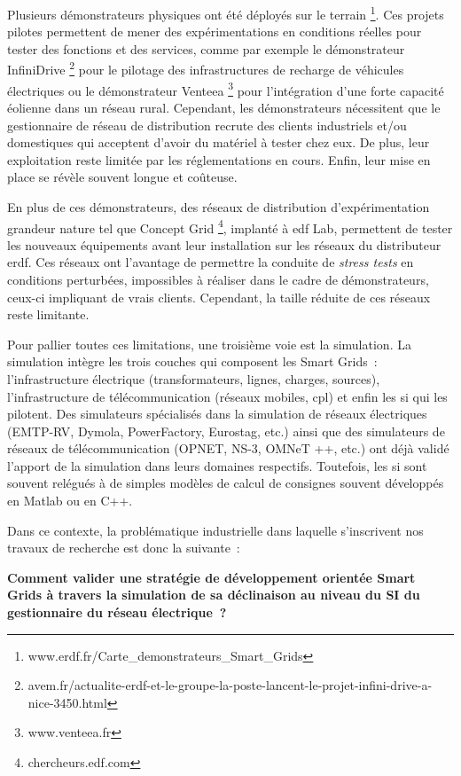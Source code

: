 Plusieurs démonstrateurs physiques ont été déployés sur le terrain 
\footnote{www.erdf.fr/Carte\_demonstrateurs\_Smart\_Grids}. Ces projets pilotes 
permettent de mener des expérimentations en conditions réelles pour tester des 
fonctions et des services, comme par exemple le démonstrateur InfiniDrive 
\footnote{avem.fr/actualite-erdf-et-le-groupe-la-poste-lancent-le-projet-infini-drive-a-nice-3450.html} 
pour le pilotage des infrastructures de recharge de véhicules électriques ou le 
démonstrateur Venteea \footnote{www.venteea.fr} pour l'intégration d'une forte 
capacité éolienne dans un réseau rural. Cependant, les démonstrateurs 
nécessitent que le gestionnaire de réseau de distribution recrute des clients 
industriels et/ou domestiques qui acceptent d'avoir du matériel à tester chez 
eux. De plus, leur exploitation reste limitée par les réglementations en cours. 
Enfin, leur mise en place se révèle souvent longue et coûteuse. 

En plus de ces démonstrateurs, des réseaux de distribution d'expérimentation 
grandeur nature tel que Concept Grid \footnote{chercheurs.edf.com}, implanté à 
\gls{edf} Lab, permettent de tester les nouveaux équipements avant leur 
installation sur les réseaux du distributeur \gls{erdf}. Ces réseaux ont 
l'avantage de permettre la conduite de \textit{stress tests} en conditions perturbées, 
impossibles à réaliser dans le cadre de démonstrateurs, ceux-ci impliquant de 
vrais clients. Cependant, la taille réduite de ces réseaux reste limitante. 

Pour pallier toutes ces limitations, une troisième voie est la simulation. La 
simulation intègre les trois couches qui composent les Smart Grids~: 
l'infrastructure électrique (transformateurs, lignes, charges, sources), 
l'infrastructure de télécommunication (réseaux mobiles, \gls{cpl}) et enfin les 
\gls{si} qui 
les pilotent. Des simulateurs spécialisés dans la simulation de réseaux 
électriques (EMTP-RV, Dymola, PowerFactory, Eurostag, etc.) ainsi que des 
simulateurs de réseaux de télécommunication (OPNET, NS-3, OMNeT ++, etc.) ont 
déjà validé l'apport de la simulation dans leurs domaines respectifs. Toutefois, 
les \gls{si} sont souvent relégués à de simples modèles de calcul de consignes 
souvent 
développés en Matlab ou en C++\cite{palensky2014simulating}. 

Dans ce contexte, la problématique industrielle dans laquelle  s'inscrivent nos 
travaux de recherche est donc la suivante~: 

\textbf{Comment valider une stratégie de développement orientée Smart Grids à 
travers la simulation de sa déclinaison au niveau du SI du gestionnaire du 
réseau électrique~?}

